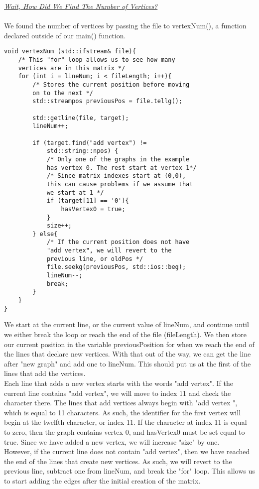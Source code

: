 \documentclass{article}
\begin{document}
\underline{\textit{Wait, How Did We Find The Number of Vertices?}} \\ \\
We found the number of vertices by passing the file to vertexNum(), a function declared outside of our main() function.
\begin{lstlisting}
void vertexNum (std::ifstream& file){
    /* This "for" loop allows us to see how many 
    vertices are in this matrix */
    for (int i = lineNum; i < fileLength; i++){
        /* Stores the current position before moving 
        on to the next */
        std::streampos previousPos = file.tellg();

        std::getline(file, target);
        lineNum++;
                
        if (target.find("add vertex") != 
            std::string::npos) {
            /* Only one of the graphs in the example 
            has vertex 0. The rest start at vertex 1*/
            /* Since matrix indexes start at (0,0), 
            this can cause problems if we assume that 
            we start at 1 */
            if (target[11] == '0'){
                hasVertex0 = true;
            }
            size++;
        } else{
            /* If the current position does not have 
            "add vertex", we will revert to the 
            previous line, or oldPos */
            file.seekg(previousPos, std::ios::beg);
            lineNum--;
            break;
        }
    }
}
\end{lstlisting}
We start at the current line, or the current value of lineNum, and continue until we either break the loop or reach the end of the file (fileLength). We then store our current position in the variable previousPosition for when we reach the end of the lines that declare new vertices. With that out of the way, we can get the line after "new graph" and add one to lineNum. This should put us at the first of the lines that add the vertices. \\
Each line that adds a new vertex starts with the words "add vertex". If the current line contains "add vertex", we will move to index 11 and check the character there. The lines that add vertices always begin with "add vertex ", which is equal to 11 characters. As such, the identifier for the first vertex will begin at the twelfth character, or index 11. If the character at index 11 is equal to zero, then the graph contains vertex 0, and hasVertex0 must be set equal to true. Since we have added a new vertex, we will increase "size" by one. \\
However, if the current line does not contain "add vertex", then we have reached the end of the lines that create new vertices. As such, we will revert to the previous line, subtract one from lineNum, and break the "for" loop. This allows us to start adding the edges after the initial creation of the matrix. \\
\end{document}
